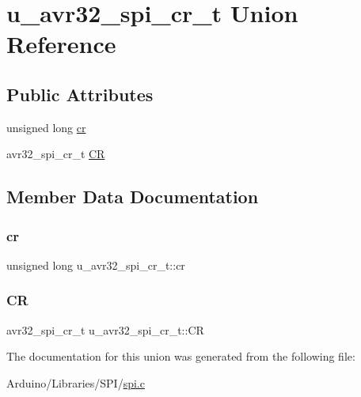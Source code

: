 \hypertarget{unionu__avr32__spi__cr__t}{}\section{u\+\_\+avr32\+\_\+spi\+\_\+cr\+\_\+t Union Reference}
\label{unionu__avr32__spi__cr__t}
\subsection*{Public Attributes}
\begin{DoxyCompactItemize}
\item 
unsigned long \hyperlink{unionu__avr32__spi__cr__t_a9a625d64d160e69baf044b8938e01468}{cr}
\item 
avr32\+\_\+spi\+\_\+cr\+\_\+t \hyperlink{unionu__avr32__spi__cr__t_afb4bf79a0ac649f1c5593215a4f0c452}{CR}
\end{DoxyCompactItemize}


\subsection{Member Data Documentation}
\mbox{\label{unionu__avr32__spi__cr__t_a9a625d64d160e69baf044b8938e01468}} 
\subsubsection{\texorpdfstring{cr}{cr}}
{\footnotesize\ttfamily unsigned long u\+\_\+avr32\+\_\+spi\+\_\+cr\+\_\+t\+::cr}

\mbox{\label{unionu__avr32__spi__cr__t_afb4bf79a0ac649f1c5593215a4f0c452}} 
\subsubsection{\texorpdfstring{CR}{CR}}
{\footnotesize\ttfamily avr32\+\_\+spi\+\_\+cr\+\_\+t u\+\_\+avr32\+\_\+spi\+\_\+cr\+\_\+t\+::\+CR}



The documentation for this union was generated from the following file\+:\begin{DoxyCompactItemize}
\item 
Arduino/\+Libraries/\+S\+P\+I/\hyperlink{spi_8c}{spi.\+c}\end{DoxyCompactItemize}

